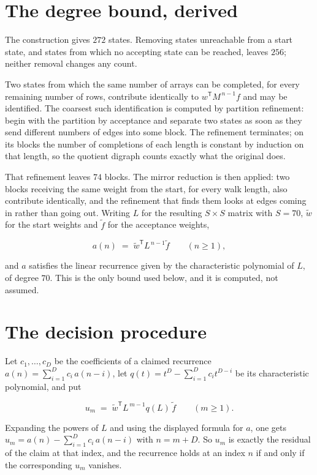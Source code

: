 \documentclass[11pt]{article}
\theoremstyle{definition}
\begin{document}
\section{The degree bound, derived}

The construction gives $272$ states. Removing states unreachable from a start state, and states from which no accepting state can be reached, leaves $256$; neither removal changes any count.

Two states from which the same number of arrays can be completed, for every remaining number of rows, contribute identically to $w^{\mathsf T}M^{\,n-1}f$ and may be identified. The coarsest such identification is computed by partition refinement: begin with the partition by acceptance and separate two states as soon as they send different numbers of edges into some block. The refinement terminates; on its blocks the number of completions of each length is constant by induction on that length, so the quotient digraph counts exactly what the original does.

That refinement leaves $74$ blocks. The mirror reduction is then applied: two blocks receiving the same weight from the start, for every walk length, also contribute identically, and the refinement that finds them looks at edges coming in rather than going out. Writing $L$ for the resulting $S \times S$ matrix with $S = 70$, $\tilde w$ for the start weights and $\tilde f$ for the acceptance weights,

\[a(n) \;=\; \tilde w^{\mathsf T} L^{\,n-1} \tilde f \qquad (n \ge 1),\]

and $a$ satisfies the linear recurrence given by the characteristic polynomial of $L$, of degree $70$. This is the only bound used below, and it is computed, not assumed.

\section{The decision procedure}

Let $c_1,\dots,c_D$ be the coefficients of a claimed recurrence $a(n) = \sum_{i=1}^{D} c_i\,a(n-i)$, let $q(t) = t^{D} - \sum_{i=1}^{D} c_i t^{D-i}$ be its characteristic polynomial, and put

\[u_m \;=\; \tilde w^{\mathsf T} L^{\,m-1} q(L)\,\tilde f \qquad (m \ge 1).\]

Expanding the powers of $L$ and using the displayed formula for $a$, one gets $u_m = a(n) - \sum_{i=1}^{D} c_i\,a(n-i)$ with $n = m + D$. So $u_m$ is exactly the residual of the claim at that index, and the recurrence holds at an index $n$ if and only if the corresponding $u_m$ vanishes.
\end{document}
